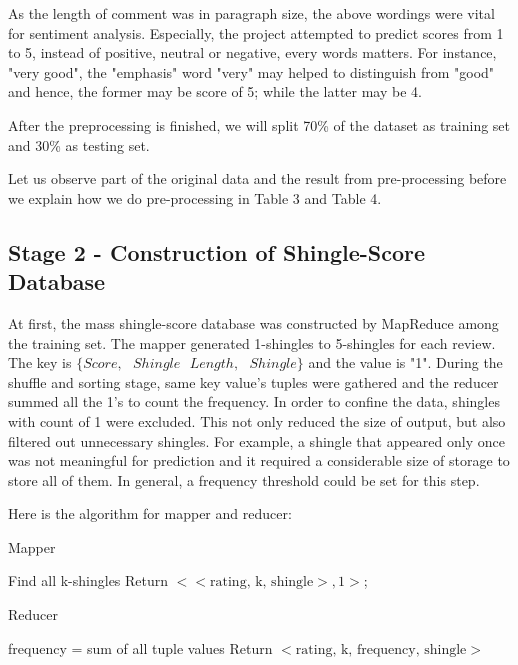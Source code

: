 As the length of comment was in paragraph size, the above wordings were vital for sentiment analysis. Especially, the project attempted to predict scores from 1 to 5, instead of positive, neutral or negative, every words matters. For instance, "very good", the "emphasis" word "very" may helped to distinguish from "good" and hence, the former may be score of 5; while the latter may be 4.

After the preprocessing is finished, we will split 70\% of the dataset as training set and 30\% as testing set.

Let us observe part of the original data and the result from pre-processing before we explain how we do pre-processing in Table 3 and Table 4.




\subsection{Stage 2 - Construction of Shingle-Score Database}
At first, the mass shingle-score database was constructed by MapReduce among the training set. The mapper generated 1-shingles to 5-shingles for each review. The key is \(\{Score,\mbox{ } Shingle\mbox{ } Length,\mbox{ } Shingle\}\) and the value is "1". During the shuffle and sorting stage, same key value's tuples were gathered and the reducer summed all the 1's to count the frequency. In order to confine the data, shingles with count of 1 were excluded.
This not only reduced the size of output, but also filtered out unnecessary shingles. For example, a shingle that appeared only once was not meaningful for prediction and it required a considerable size of storage to store all of them.
In general, a frequency threshold could be set for this step.

Here is the algorithm for mapper and reducer:
\begin{algorithm}
\DontPrintSemicolon
{}
\caption{Mapper}
	{
		{
			\label{forins}
			Find all k-shingles\;
			{
				Return \(<<\mbox{rating, k, shingle}>, 1>\);
			}
 		}
	}
\end{algorithm}

\begin{algorithm}
\DontPrintSemicolon
{}

\caption{Reducer}
	 {
		frequency = sum of all tuple values\;
		Return \(<\mbox{rating, k, frequency, shingle}>\)\;
	}
\end{algorithm}

